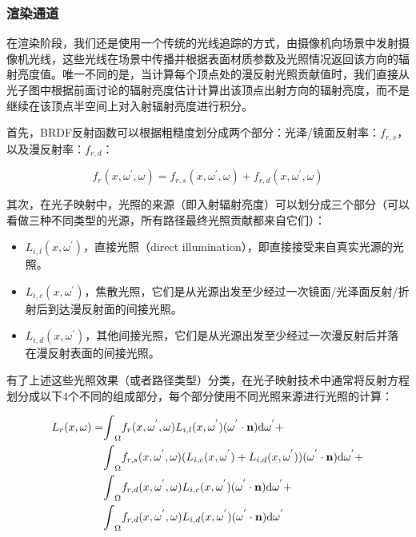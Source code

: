 \subsubsection{渲染通道}
在渲染阶段，我们还是使用一个传统的光线追踪的方式，由摄像机向场景中发射摄像机光线，这些光线在场景中传播并根据表面材质参数及光照情况返回该方向的辐射亮度值。唯一不同的是，当计算每个顶点处的漫反射光照贡献值时，我们直接从光子图中根据前面讨论的辐射亮度估计计算出该顶点出射方向的辐射亮度，而不是继续在该顶点半空间上对入射辐射亮度进行积分。

首先，BRDF反射函数可以根据粗糙度划分成两个部分：光泽/镜面反射率：$f_{r,s}$，以及漫反射率：$f_{r,d}$：

\begin{equation}
	f_r(x,{\omega}^{'},{\omega})=f_{r,s}(x,{\omega}^{'},{\omega})+f_{r,d}(x,{\omega}^{'},{\omega})
\end{equation}

其次，在光子映射中，光照的来源（即入射辐射亮度）可以划分成三个部分（可以看做三种不同类型的光源，所有路径最终光照贡献都来自它们）：

\begin{itemize}
	\item $L_{i,l}(x,{\omega}^{'})$，直接光照（direct illumination），即直接接受来自真实光源的光照。
	\item $L_{i,c}(x,{\omega}^{'})$，焦散光照，它们是从光源出发至少经过一次镜面/光泽面反射/折射后到达漫反射面的间接光照。
	\item $L_{i,d}(x,{\omega}^{'})$，其他间接光照，它们是从光源出发至少经过一次漫反射后并落在漫反射表面的间接光照。
\end{itemize}

有了上述这些光照效果（或者路径类型）分类，在光子映射技术中通常将反射方程划分成以下4个不同的组成部分，每个部分使用不同光照来源进行光照的计算：

\begin{equation}\label{e:pm-four-componenets-equation}
\begin{aligned}
	L_r(x,{\omega})=&{\rm \int}_\Omega f_r(x,{\omega}^{'},{\omega}) L_{i,l}(x,{\omega}^{'}) ({\omega}^{'}\cdot\mathbf{n}) {\rm d}{\omega}^{'}+ \\
	&{\rm \int}_\Omega f_{r,s}(x,{\omega}^{'},{\omega}) (L_{i,c}(x,{\omega}^{'})+L_{i,d}(x,{\omega}^{'})) ({\omega}^{'}\cdot\mathbf{n}) {\rm d}{\omega}^{'}+ \\
	&{\rm \int}_\Omega f_{r,d}(x,{\omega}^{'},{\omega}) L_{i,c}(x,{\omega}^{'}) ({\omega}^{'}\cdot\mathbf{n}) {\rm d}{\omega}^{'}+ \\
	&{\rm \int}_\Omega f_{r,d}(x,{\omega}^{'},{\omega}) L_{i,d}(x,{\omega}^{'}) ({\omega}^{'}\cdot\mathbf{n}) {\rm d}{\omega}^{'}
\end{aligned}
\end{equation}

